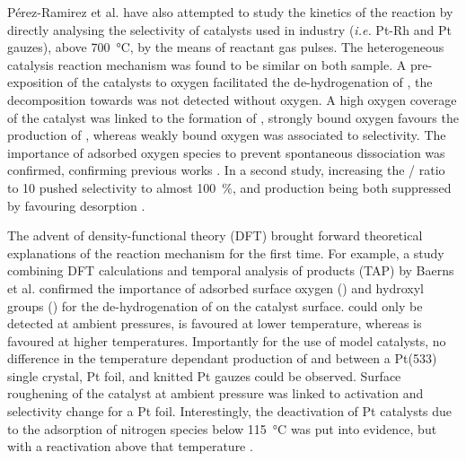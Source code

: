 Pérez-Ramirez et al. \parencite*{PerezRamirez2004} have also attempted to study the kinetics of the reaction by directly analysing the selectivity of catalysts used in industry (\textit{i.e.} Pt-Rh and Pt gauzes), above \qty{700}{\degreeCelsius}, by the means of reactant gas pulses.
The heterogeneous catalysis reaction mechanism was found to be similar on both sample.
A pre-exposition of the catalysts to oxygen facilitated the de-hydrogenation of , the decomposition towards  was not detected without oxygen.
A high oxygen coverage of the catalyst was linked to the formation of , strongly bound oxygen favours the production of , whereas weakly bound oxygen was associated to  selectivity.
The importance of adsorbed oxygen species to prevent spontaneous  dissociation was confirmed, confirming previous works \parencite{Bradley1995}.
In a second study, increasing the / ratio to 10 pushed  selectivity to almost \qty{100}{\percent},  and  production being both suppressed by favouring  desorption \parencite{PerezRamirez2009}.

The advent of density-functional theory (DFT) brought forward theoretical explanations of the reaction mechanism for the first time.
For example, a study combining DFT calculations and temporal analysis of products (TAP) by Baerns et al. \parencite*{Baerns2005} confirmed the importance of adsorbed surface oxygen () and hydroxyl groups () for the de-hydrogenation of  on the catalyst surface.
 could only be detected at ambient pressures,  is favoured at lower temperature, whereas  is favoured at higher temperatures.
Importantly for the use of model catalysts, no difference in the temperature dependant production of  and  between a Pt(533) single crystal, Pt foil, and knitted Pt gauzes could be observed.
Surface roughening of the catalyst at ambient pressure was linked to activation and selectivity change for a Pt foil.
Interestingly, the deactivation of Pt catalysts due to the adsorption of nitrogen species below \qty{115}{\degreeCelsius} was put into evidence, but with a reactivation above that temperature \parencite{Sobczyk2004}.

